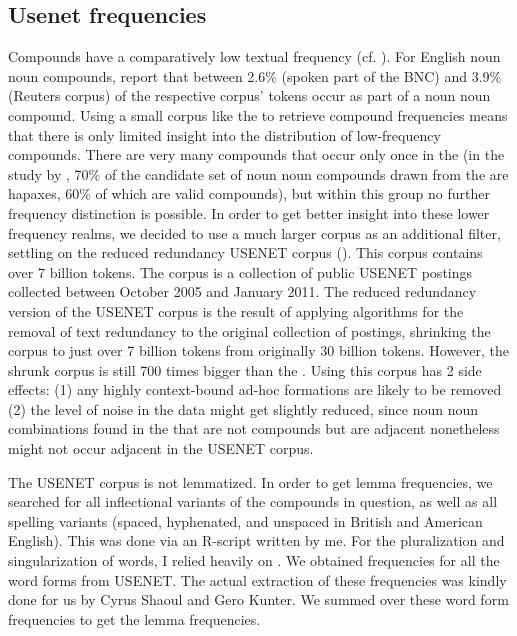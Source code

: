 \subsection{Usenet frequencies}
\label{sec:freqUsenet}
Compounds have a comparatively low textual frequency
(cf. \citealt[776]{Plagetal:2008}). For English noun noun compounds, \citet{Baldwin_and_Tanaka:2004}
report that between 2.6\% (spoken part of the BNC) and 3.9\% (Reuters
corpus) of
the respective corpus' tokens occur as part of a noun noun compound.
Using a small corpus like the  to retrieve compound frequencies
means that there is only limited insight into the distribution of
low-frequency compounds. There are very many compounds that
occur only once in the  (in the study by
\citealt{LapataandLascarides:2003}, 70\% of the candidate set of noun noun
compounds drawn from the  are hapaxes, 60\% of which are valid compounds), but within this group no further frequency
distinction is possible. In order to get better insight into these
lower frequency realms, we decided to use a much larger corpus as an
additional filter, settling on the reduced redundancy USENET corpus
(\citealt{ShaoulandWestbury:2013}). This corpus contains over 7
billion tokens. The corpus is a collection of public USENET postings
collected between October 2005 and January 2011. The reduced
redundancy version of the USENET corpus is the result of applying
algorithms for the removal of text redundancy to the original
collection of postings, shrinking the corpus to just over 7 billion tokens
from originally 30 billion tokens. However, the shrunk corpus is still 700 times
bigger than the .
Using this corpus has 2 side effects: (1) any highly
context-bound ad-hoc formations are likely to be removed (2) the level
of noise in the data might get slightly reduced, since noun noun
combinations found in the  that are not compounds but are adjacent
nonetheless might not occur adjacent in the USENET corpus.

The USENET corpus is not lemmatized. In order to get lemma
frequencies, we searched for all inflectional variants of the
compounds in question, as well as all spelling variants (spaced,
hyphenated, and unspaced in British and American English). This was
done via an R-script written by me. For the pluralization and
singularization of words, I relied
heavily on \citet{Conway}. We obtained frequencies for all the
word forms from USENET. The actual extraction of these frequencies was kindly done for us by Cyrus Shaoul and Gero Kunter.
We summed
over these word form frequencies to get the lemma frequencies. 



